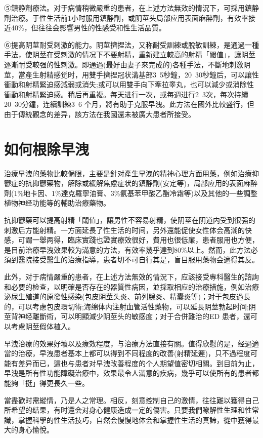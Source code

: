 \documentclass[12pt,UTF8]{ctexbook}
\begin{document}
⑤鎮静劑療法。对于病情稍微嚴重的患者，在上述方法無效的情況下，可採用鎮静劑治療。于性生活前1小时服用鎮静劑，或阴莖头局部应用表面麻醉劑，有效率接近40\%，但往往会影響男性的性感受和性生活品質。

⑥提高阴莖耐受刺激的能力。阴莖擠捏法，又称耐受訓練或脫敏訓練，是通過一種手法，使阴莖在受刺激的情况下不要射精，重新建立較高的射精「閾值」，讓阴莖逐漸耐受較强的性刺激。即通過(最好由妻子來完成的)各種手法，不斷地刺激阴莖，當產生射精感觉时，用雙手擠捏冠状溝基部3~5秒鐘，20~30秒鐘后，可以讓性衝動和射精緊迫感減弱或消失;或可以用雙手向下牽拉睾丸，也可以減少或消除性衝動和射精緊迫感。稍后再重複。每天进行一次，或每週进行2~3次，每次持續20~30分鐘，连續訓練3~6 个月，將有助于克服早洩。此方法在國外比較盛行，但由于傳統觀念的差异，該方法在我國還未被廣大患者所接受。

\section{如何根除早洩}

治療早洩的藥物比較侷限，主要是針对產生早洩的精神心理方面用藥，例如治療抑鬱症的抗抑鬱藥物，解除或緩解焦慮症状的鎮静劑(安定等)，局部应用的表面麻醉劑(1\%地卡因、1\%達克羅寧油膏、3\%氨基苯甲酸乙酯冷霜等)以及其他的一些調整植物神经功能等的輔助治療藥物。

抗抑鬱藥可以提高射精「閾值」，讓男性不容易射精，使阴莖在阴道内受到很强的刺激后方能射精。一方面延長了性生活的时间，另外還能促使女性体会高潮的快感，可謂一舉两得，臨床實踐也證實療效很好，費用也很低廉，患者服用也方便，是目前治療早洩效果較为滿意的方法，有效率幾乎達到80\%以上。然而，此方法必須到醫院接受醫生的治療指導，患者切不可自行其是，盲目服用藥物会適得其反。

此外，对于病情嚴重的患者，在上述方法無效的情況下，应該接受專科醫生的諮詢和必要的检查，以明確是否存在的器質性病因，並採取相应的治療措施，例如治療泌尿生殖道的原發性感染(包皮阴莖头炎、前列腺炎、精囊炎等)；对于包皮過長的，可以考慮包皮環切術;海绵体内注射血管活性藥物，可以延長阴莖勃起时间;阴莖背神经離斷術，可以明顯減少阴莖头的敏感度；对于合併難治的ED 患者，還可以考慮阴莖假体植入。

早洩治療的效果好壞以及療效程度，与治療方法直接有關。值得欣慰的是，经過適當的治療，早洩患者基本上都可以得到不同程度的改善(射精延遲)，只不過程度可能有差异而已，這也与患者对早洩改善程度的个人期望值密切相關。到目前为止，早洩是所有性功能障礙治療中，效果最令人滿意的疾病，幾乎可以使所有的患者都能夠「挺」得更長久一些。

當盡歡时需縱情，乃是人之常理。相反，刻意控制自己的激情，往往難以獲得自己所希望的结果，有时還会对身心健康造成一定的傷害。只要我們瞭解性生理和性常識，掌握科學的性生活技巧，自然会慢慢地体会和掌握性生活的真諦，從中獲得最大的身心愉悅。
\end{document}
